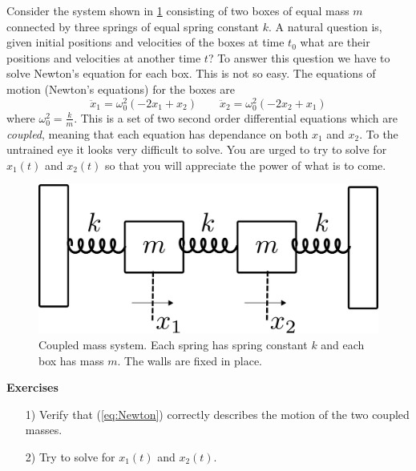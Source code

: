 Consider the system shown in \ref{Fig:CoupledMasses} consisting of two boxes of equal mass $m$ connected by three springs of equal spring constant $k$.  A natural question is, given initial positions and velocities of the boxes at time $t_{0}$ what are their positions and velocities at another time $t$?  To answer this question we have to solve Newton's equation for each box.  This is not so easy.  The equations of motion (Newton's equations) for the boxes are
\begin{equation} \label{eq:Newton}
\ddot{x}_{1} = \omega_{0}^{2} (-2x_{1} + x_{2}) \qquad
\ddot{x}_{2} = \omega_{0}^{2} (-2x_{2} + x_{1})
\end{equation}
where $\omega^{2}_{0} = \frac{k}{m}$.  This is a set of two second order differential equations which are \textit{coupled}, meaning that each equation has dependance on both $x_1$ and $x_2$.  To the untrained eye it looks very difficult to solve.  You are urged to try to solve for $x_{1}(t)$ and $x_{2}(t)$ so that you will appreciate the power of what is to come.

\begin{figure}
\begin{centering}
\includegraphics[width=12cm]{boxes.pdf}
\par\end{centering}
\caption{Coupled mass system. Each spring has spring constant $k$ and each box has mass $m$. The walls are fixed in place.}
\label{Fig:CoupledMasses}
\end{figure}

\begin{flushleft}\textbf{Exercises}\end{flushleft} %
\begin{itemize}\item[1)] Verify that (\ref{eq:Newton}) correctly describes the motion of the two coupled masses.\item[2)] Try to solve for $x_{1}(t)$ and $x_{2}(t)$.\end{itemize}

